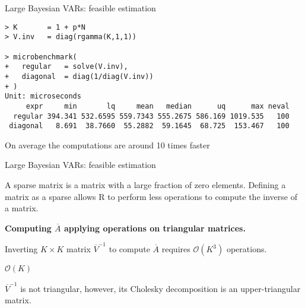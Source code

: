 \documentclass[notes,blackandwhite,mathsans,usenames,dvipsnames]{beamer}
\begin{document}
\begin{frame}[fragile]{Large Bayesian VARs: feasible estimation}

\scriptsize
\begin{verbatim}
> K       = 1 + p*N
> V.inv   = diag(rgamma(K,1,1))

> microbenchmark(
+   regular   = solve(V.inv),
+   diagonal  = diag(1/diag(V.inv))
+ )
Unit: microseconds
     expr     min       lq     mean   median      uq      max neval
  regular 394.341 532.6595 559.7343 555.2675 586.169 1019.535   100
 diagonal   8.691  38.7660  55.2882  59.1645  68.725  153.467   100
\end{verbatim}

\normalsize\bigskip
{\color{mcxs2}On average the computations are around 10 times faster}

\end{frame}






\begin{frame}{Large Bayesian VARs: feasible estimation}

{\color{mcxs2}A sparse matrix is a matrix with a large fraction of zero elements. Defining a matrix as a sparse allows R to perform less operations to compute the inverse of a matrix.}

\bigskip\textbf{Computing $\overline{A}$ applying operations on triangular matrices.}

{\color{mcxs2}Inverting} $K\times K$ {\color{mcxs2}matrix} $\overline{V}^{-1}$ {\color{mcxs2}to compute} $\overline{A}$ {\color{mcxs2}requires} $\mathcal{O}\left(K^3\right)$ {\color{mcxs2}operations.} 

 $\mathcal{O}\left(K\right)$

\bigskip$\overline{V}^{-1}$ {\color{mcxs2}is not triangular, however, its Cholesky decomposition is an upper-triangular matrix.}

\end{frame}
\end{document}
